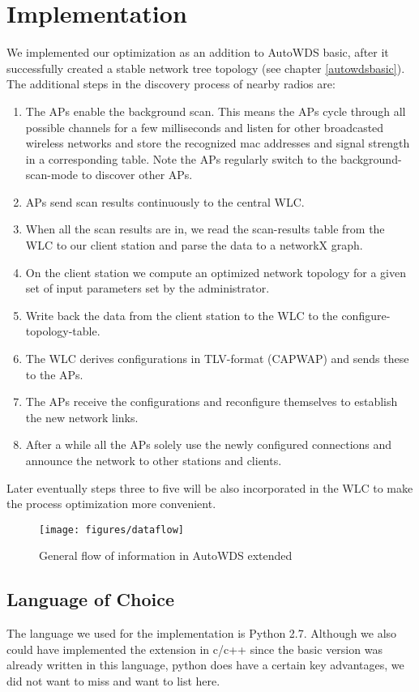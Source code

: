 \chapter{Implementation}
  We implemented our optimization as an addition to AutoWDS basic, after it successfully created a stable network tree topology (see chapter \ref{autowdsbasic}).
  The additional steps in the discovery process of nearby radios are:
  
  \begin{enumerate}
   \item The APs enable the background scan. This means the APs cycle through all possible channels for a few milliseconds 
    and listen for other broadcasted wireless networks and store the recognized mac addresses and signal strength in a corresponding table.
    Note the APs regularly switch to the background-scan-mode to discover other APs.
   \item APs send scan results continuously to the central \ac{WLC}.
   \item When all the scan results are in, we read the scan-results table from the \ac{WLC} to our client station and parse the data to a networkX graph.
   \item On the client station we compute an optimized network topology for a given set of input parameters set by the administrator. 
   \item Write back the data from the client station to the WLC to the configure-topology-table.
   \item The \ac{WLC} derives configurations in \ac{TLV}-format (\ac{CAPWAP}) and sends these to the APs.
   \item The APs receive the configurations and reconfigure themselves to establish the new network links.
   \item After a while all the APs solely use the newly configured connections and announce the network to other stations and clients.
  \end{enumerate}
  
  Later eventually steps three to five will be also incorporated in the \ac{WLC} to make the process optimization more convenient.
  
  \begin{figure}[h!]
    \centering
    \texttt{[image: figures/dataflow]}
    \caption{General flow of information in AutoWDS extended}
    \label{fig:dataflow}
  \end{figure}

  \section{Language of Choice}
    The language we used for the implementation is Python 2.7. Although we also could have implemented the extension in c/c++ since the basic version
    was already written in this language, python does have a certain key advantages, we did not want to miss and want to list here.
    
